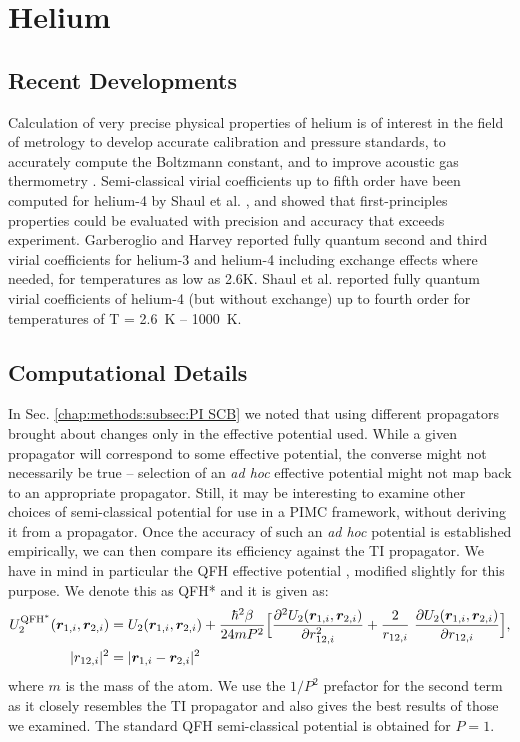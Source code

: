\chapter{Helium}
\label{chap:he}
\section{Recent Developments}
    Calculation of very precise physical properties of helium is of interest in the field of metrology to develop accurate calibration and pressure standards, to accurately compute the Boltzmann constant, and to improve acoustic gas thermometry  \cite{Garberoglio2009,Fellmuth2006,Schmidt2007,Pitre2006,Moldover2010,Aziz1995}. Semi-classical virial coefficients up to fifth order have been computed for helium-4 by Shaul et al. \cite{Shaul2012SC}, and showed that first-principles properties could be evaluated with precision and accuracy that exceeds experiment. Garberoglio and Harvey \cite{Garberoglio2009,Garberoglio2011,Garberoglio2011b} reported fully quantum second and third virial coefficients for helium-3 and helium-4 including exchange effects where needed, for temperatures as low as 2.6K. Shaul et al. \cite{Shaul2012} reported fully quantum virial coefficients of helium-4 (but without exchange) up to fourth order for temperatures of T = 2.6~K -- 1000~K.
\section{Computational Details}
    In Sec. \ref{chap:methods:subsec:PI SCB} we noted that using different propagators brought about changes only in the effective potential used. While a given propagator will correspond to some effective potential, the converse might not necessarily be true -- selection of an \emph{ad hoc} effective potential might not map back to an appropriate propagator. Still, it may be interesting to examine other choices of semi-classical potential for use in a PIMC framework, without deriving it from a propagator. Once the accuracy of such an \emph{ad hoc} potential is established empirically, we can then compare its efficiency against the TI propagator. We have in mind in particular the QFH effective potential \cite{Feynman, Schenter2002},
    modified slightly for this purpose. We denote this as QFH* and it is given as:
    \begin{equation}\label{eq:QFHCh3}
        \begin{aligned}
            U_2^{\rm QFH^*} (\bm{r}_{1,i}, \bm{r}_{2,i}) &= U_2 (\bm{r}_{1,i}, \bm{r}_{2,i}) + \displaystyle\frac{\hbar^2 \beta}{24 m P^2} \Big[ \frac{\partial^2 U_2 (\bm{r}_{1,i}, \bm{r}_{2,i})}{\partial r_{12,i}^2} + \frac{2}{r_{12,i}}~\frac{\partial U_2 (\bm{r}_{1,i}, \bm{r}_{2,i})}{\partial r_{12,i}}  \Big],\\
            |r_{12,i}|^2 &= |\bm{r}_{1,i} - \bm{r}_{2,i}|^2
        \end{aligned}
    \end{equation}
    where $m$ is the mass of the atom. We use the $1/P^2$ prefactor for the second term as it closely resembles the TI propagator and also gives the best results of those we examined. The standard QFH semi-classical potential is obtained for $P = 1$.

